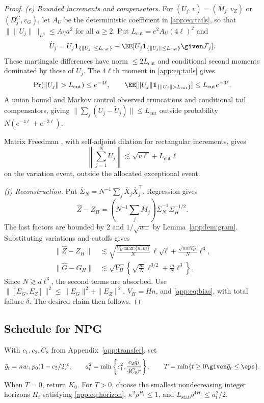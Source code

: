 \begin{proof}
\emph{(e) Bounded increments and compensators.}
For $(U_j,v)=(\overline M_j,v_Z)$ or $(D_j^G,v_G)$, let $A_U$ be the
deterministic coefficient in \eqref{app:eq:tails}, so that
$\|\|U_j\|\|_{L^a}\le A_Ua^2$ for all $a\ge2$. Put
$L_{\mathrm{cut}}=e^2A_U(4\ell)^2$ and
\[
 \widetilde U_j
 =U_j\mathbf1_{\{\|U_j\|\le L_{\mathrm{cut}}\}}
 -\EE[U_j\mathbf1_{\{\|U_j\|\le L_{\mathrm{cut}}\}}\given\mathcal F_j].
\]
These martingale differences have norm $\le2L_{\mathrm{cut}}$
and conditional second moments dominated by those of $U_j$.
The $4\ell$th moment in \eqref{app:eq:tails} gives
\[
 \Pr(\|U_j\|>L_{\mathrm{cut}})\le e^{-4\ell},\qquad
 \EE[\|U_j\|\mathbf1_{\{\|U_j\|>L_{\mathrm{cut}}\}}]
           \le L_{\mathrm{cut}}e^{-3\ell}.
\]
A union bound and Markov control observed truncations and conditional
tail compensators, giving
$\|\sum_j(U_j-\widetilde U_j)\|\le L_{\mathrm{cut}}$
outside probability $N(e^{-4\ell}+e^{-3\ell})$.

Matrix Freedman \citep{tropp2011freedman}, with self-adjoint
dilation for rectangular increments, gives
\[
 \left\|\sum_{j=1}^NU_j\right\|
 \lesssim\sqrt{v\ell}+L_{\mathrm{cut}}\ell
\]
on the variation event, outside the allocated exceptional event.

\emph{(f) Reconstruction.}
Put $\overline\Sigma_N=N^{-1}\sum_j\overline X_j\overline X_j^\top$.
Regression gives
\[
 \widehat Z-Z_H
 =\left(N^{-1}\sum_j\overline M_j\right)
    \overline\Sigma_N^{-1}\Sigma_H^{-1/2}.
\]
The last factors are bounded by $2$ and $1/\sqrt{w_-}$
by Lemma~\ref{app:lem:gram}. Substituting variations and cutoffs gives
\[
 \begin{split}
 \|\widehat Z-Z_H\|
 &\lesssim\sqrt{\frac{V_H\max\{n,m\}}N}\,\ell\sqrt{\ell}
           +\frac{\sqrt{mnV_H}}N\ell^3,\\
 \|\widehat G-G_H\|
 &\lesssim\sqrt{V_H}
          \left\{\sqrt{\frac mN}\,\ell^{3/2}
                        +\frac mN\ell^3\right\}.
 \end{split}
\]
Since $N\gtrsim d\ell^3$, the second terms are absorbed.
Use $\|[E_G,E_Z]\|^2\le\|E_G\|^2+\|E_Z\|^2$,
$V_H=Hn$, and \eqref{app:eq:bias}, with total failure $\delta$.
The desired claim then follows.
\end{proof}

\subsection{Schedule for NPG}\label{app:schedule}

With $c_1,c_2,C_8$ from Appendix~\ref{app:transfer}, set
\[
 \bar g_t=nw_+p_0(1-c_2/2)^t,\qquad
 a_t^2=\min\left\{c_1^2,\frac{c_2\bar g_t}{4C_8r}\right\},
 \qquad T=\min\{t\ge0\given\bar g_t\le\eps\}.
\]
When $T=0$, return $K_0$.
For $T>0$, choose the smallest nondecreasing integer horizons $H_t$
satisfying \eqref{app:eq:horizon}, $\kappa^2\rho^{H_t}\le1$, and
$L_{\mathrm{stat}}\rho^{4H_t}\le a_t^2/2$.

